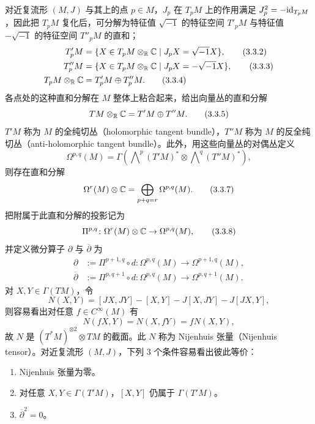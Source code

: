 对近复流形 $(M,J)$ 与其上的点 $p\in M$，$J_p$ 在 $T_pM$ 上的作用满足 $J_p^2=-\mathrm{id}_{T_pM}$，因此把 $T_pM$ 复化后，可分解为特征值 $\sqrt{-1}$ 的特征空间 $T'_pM$ 与特征值 $-\sqrt{-1}$ 的特征空间 $T''_pM$ 的直和；
\begin{align}
  T'_pM&=\{X\in T_pM\otimes_{\mathbb{R}}\mathbb{C}\mid J_pX=\sqrt{-1}X\}, \tag{3.3.2}\\
  T''_pM&=\{X\in T_pM\otimes_{\mathbb{R}}\mathbb{C}\mid J_pX=-\sqrt{-1}X\}, \tag{3.3.3}\\
  T_pM\otimes_{\mathbb{R}}\mathbb{C}&=T'_pM\oplus T''_pM. \tag{3.3.4}
\end{align}
各点处的这种直和分解在 $M$ 整体上粘合起来，给出向量丛的直和分解
\begin{equation}
  TM\otimes_{\mathbb{R}}\mathbb{C}=T'M\oplus T''M.
  \tag{3.3.5}
\end{equation}
$T'M$ 称为 $M$ 的全纯切丛（holomorphic tangent bundle），$T''M$ 称为 $M$ 的反全纯切丛（anti-holomorphic tangent bundle）。此外，用这些向量丛的对偶丛定义
\begin{equation}
  \Omega^{p,q}(M)=\Gamma\left(\bigwedge\nolimits^p(T'M)^*\otimes\bigwedge\nolimits^q(T''M)^*\right),
  \tag{3.3.6}
\end{equation}
则存在直和分解
\begin{equation}
  \Omega^r(M)\otimes\mathbb{C}=\bigoplus_{p+q=r}\Omega^{p,q}(M).
  \tag{3.3.7}
\end{equation}
把附属于此直和分解的投影记为
\begin{equation}
  \Pi^{p,q}\colon\Omega^r(M)\otimes\mathbb{C}\to\Omega^{p,q}(M),
  \tag{3.3.8}
\end{equation}
并定义微分算子 $\partial$ 与 $\overline{\partial}$ 为
\begin{align}
  \partial&:=\Pi^{p+1,q}\circ d\colon\Omega^{p,q}(M)\to\Omega^{p+1,q}(M), \tag{3.3.9}\\
  \overline{\partial}&:=\Pi^{p,q+1}\circ d\colon\Omega^{p,q}(M)\to\Omega^{p,q+1}(M). \tag{3.3.10}
\end{align}
对 $X,Y\in\Gamma(TM)$，令
\begin{equation}
  N(X,Y)=[JX,JY]-[X,Y]-J[X,JY]-J[JX,Y],
  \tag{3.3.11}
\end{equation}
则容易看出对任意 $f\in C^\infty(M)$ 有
\begin{equation}
  N(fX,Y)=N(X,fY)=fN(X,Y),
  \tag{3.3.12}
\end{equation}
故 $N$ 是 $(T^*M)^{\otimes2}\otimes TM$ 的截面。此 $N$ 称为 Nijenhuis 张量（Nijenhuis tensor）。对近复流形 $(M,J)$，下列 3 个条件容易看出彼此等价：
\begin{enumerate}[leftmargin=2.5em,itemsep=2pt,topsep=3pt]
  \item Nijenhuis 张量为零。
  \item 对任意 $X,Y\in\Gamma(T'M)$，$[X,Y]$ 仍属于 $\Gamma(T'M)$。
  \item $\overline{\partial}^2=0$。
\end{enumerate}

